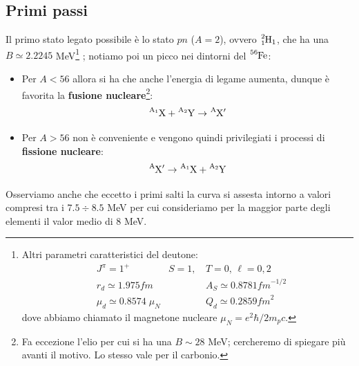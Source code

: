 \subsection{Primi passi} 
Il primo stato legato possibile è lo stato $pn$ ($A=2$), ovvero $\ce{^2_1H_1}$, che ha una $B\simeq 2.2245$ MeV\footnote{Altri parametri caratteristici del deutone:%
\begin{align*}%
    &J^\pi = 1^+ & S=1,\, &T= 0,\, \ell = 0,2 \\
    &r_d \simeq 1.975 \unit{fm} & &A_S \simeq 0.8781 \unit{fm}^{-1/2} \\
    &\mu_d \simeq 0.8574\;\mu_N & &Q_d \simeq 0.2859 \unit{fm}^2 
\end{align*}%
dove abbiamo chiamato il magnetone nucleare $\mu_N = e^2\hbar/2m_p c$.}%
; notiamo poi un picco nei dintorni del $\ce{^56Fe}$:
\begin{itemize}
    \item Per $A<56$ allora si ha che  anche l'energia di legame aumenta, dunque è favorita la \textbf{fusione nucleare}\footnote{Fa eccezione l'elio per cui si ha una $B\sim 28$ MeV; cercheremo di spiegare più avanti il motivo. Lo stesso vale per il carbonio.}:
    $$\ce{^{A_1}X} + \ce{^{A_2}Y} \to \ce{^AX}'$$
    \item Per $A>56$  non è conveniente e vengono quindi privilegiati i processi di \textbf{fissione nucleare}:
    $$\ce{^AX}' \to \ce{^{A_1}X} + \ce{^{A_2}Y}$$
\end{itemize}
\noindent Osserviamo anche che eccetto i primi salti la curva si assesta intorno a valori compresi tra i $7.5 \div 8.5$ MeV per cui consideriamo per la maggior parte degli elementi il valor medio di 8 MeV.


